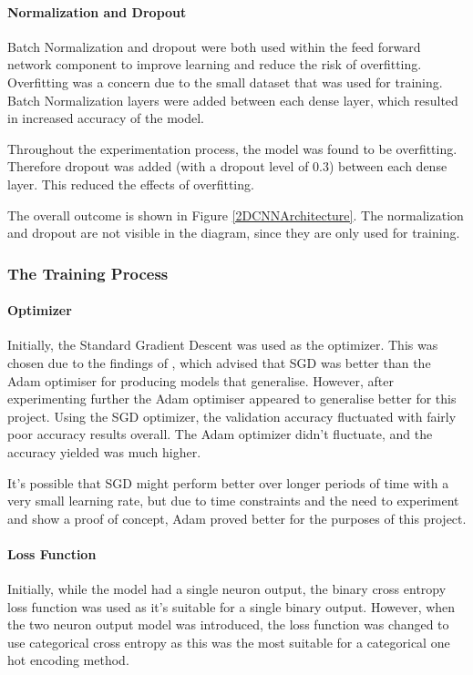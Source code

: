 \documentclass[10pt,a4paper]{article}
\begin{document}

            \paragraph{Normalization and Dropout}
            Batch Normalization and dropout were both used within the feed forward network component to improve learning and reduce the risk of overfitting. Overfitting was a concern due to the small dataset that was used for training.
            Batch Normalization layers were added between each dense layer, which resulted in increased accuracy of the model.



            Throughout the experimentation process, the model was found to be overfitting. Therefore dropout was added (with a dropout level of 0.3) between each dense layer. This reduced the effects of overfitting.

            The overall outcome is shown in Figure \ref{2DCNNArchitecture}. The normalization and dropout are not visible in the diagram, since they are only used for training.


        \subsubsection{The Training Process}
            \paragraph{Optimizer}
            Initially, the Standard Gradient Descent was used as the optimizer. This was chosen due to the findings of \cite{SGDBetterThanAdamForImageClassification},
            which advised that SGD was better than the Adam optimiser for producing models that generalise. However, after experimenting further the Adam optimiser appeared
            to generalise better for this project. Using the SGD optimizer, the validation accuracy fluctuated with fairly poor accuracy results overall. The Adam optimizer
            didn't fluctuate, and the accuracy yielded was much higher.

            It's possible that SGD might perform better over longer periods of time with a very small learning rate, but due to time constraints and the need to experiment and show a proof of concept,
            Adam proved better for the purposes of this project.


            \paragraph{Loss Function}
                Initially, while the model had a single neuron output, the binary cross entropy loss function was used as it's suitable for a single binary output.
                However, when the two neuron output model was introduced, the loss function was changed to use categorical cross entropy as this was the most suitable
                for a categorical one hot encoding method.
\end{document}
